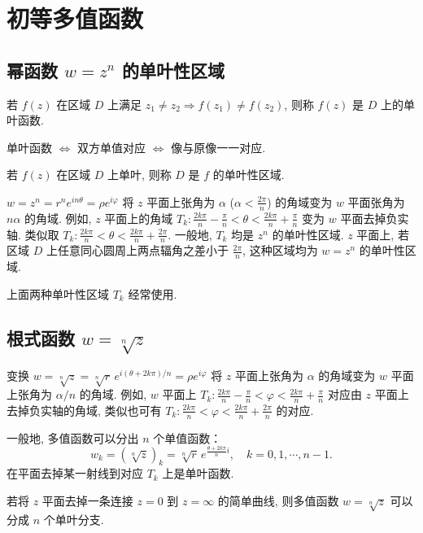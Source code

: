 \documentclass[theorem=false,mathfont=none,openany,sub3section]{easybook}
\begin{document}
\newpage

\section{初等多值函数}

\subsection{\texorpdfstring{幂函数 $w=z^{n}$ 的单叶性区域}{幂函数 w 等于 z 的 n 次幂的单叶性区域}}

\begin{definition}
  若 $f(z)$ 在区域 $D$ 上满足 $z_{1}\neq z_{2}\Rightarrow f(z_{1})\neq f(z_{2})$, 则称 $f(z)$ 是 $D$ 上的单叶函数.\par
  单叶函数 $\Leftrightarrow$ 双方单值对应 $\Leftrightarrow$ 像与原像一一对应.
\end{definition}

\begin{definition}
  若 $f(z)$ 在区域 $D$ 上单叶, 则称 $D$ 是 $f$ 的单叶性区域.
\end{definition}

$w=z^{n}=r^{n}e^{in\theta}=\rho e^{i\varphi}$ 将 $z$ 平面上张角为 $\alpha$ ($\alpha<\frac{2\pi}{n}$) 的角域变为 $w$ 平面张角为 $n\alpha$ 的角域.
例如, $z$ 平面上的角域 $T_{k}:\frac{2k\pi}{n}-\frac{\pi}{n}<\theta<\frac{2k\pi}{n}+\frac{\pi}{n}$ 变为 $w$ 平面去掉负实轴. 类似取 $T_{k}:\frac{2k\pi}{n}<\theta<\frac{2k\pi}{n}+\frac{2\pi}{n}$.
一般地, $T_{k}$ 均是 $z^{n}$ 的单叶性区域.
$z$ 平面上, 若区域 $D$ 上任意同心圆周上两点辐角之差小于 $\frac{2\pi}{n}$, 这种区域均为 $w=z^{n}$ 的单叶性区域.

\begin{remark}
  上面两种单叶性区域 $T_{k}$ 经常使用.
\end{remark}

\subsection{\texorpdfstring{根式函数 $w=\sqrt[n]{z}$}{复数的 n 次方根函数}}

变换 $w=\sqrt[n]{z}=\sqrt[n]{r}\,e^{i(\theta+2k\pi)/n}=\rho e^{i\varphi}$ 将 $z$ 平面上张角为 $\alpha$ 的角域变为 $w$ 平面上张角为 $\alpha/n$ 的角域.
例如, $w$ 平面上 $T_{k}:\frac{2k\pi}{n}-\frac{\pi}{n}<\varphi<\frac{2k\pi}{n}+\frac{\pi}{n}$ 对应由 $z$ 平面上去掉负实轴的角域, 类似也可有 $T_{k}:\frac{2k\pi}{n}<\varphi<\frac{2k\pi}{n}+\frac{2\pi}{n}$ 的对应.

一般地, 多值函数可以分出 $n$ 个单值函数：
\[
w_{k}=(\sqrt[n]{z})_{k}=\sqrt[n]{r}\,e^{\frac{\theta+2k\pi}{n}i},\quad k=0,1,\cdots,n-1.
\]
在平面去掉某一射线到对应 $T_{k}$ 上是单叶函数.\par
若将 $z$ 平面去掉一条连接 $z=0$ 到 $z=\infty$ 的简单曲线, 则多值函数 $w=\sqrt[n]{z}$ 可以分成 $n$ 个单叶分支.
\end{document}
